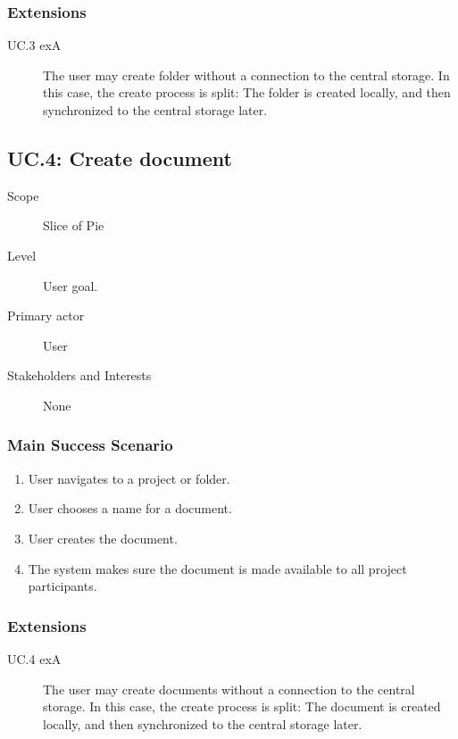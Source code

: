 \subsubsection{Extensions}
\begin{description}
    \item[UC.3 exA] The user may create folder without a connection to the central storage.
        In this case, the create process is split: The folder is created locally, and then synchronized
        to the central storage later.
\end{description}

\subsection{UC.4: Create document}
\begin{description}
    \item[Scope] Slice of Pie
    \item[Level] User goal.
    \item[Primary actor] User
    \item[Stakeholders and Interests] None
\end{description}
    
\subsubsection{Main Success Scenario}
\begin{enumerate}
    \item User navigates to a project or folder.
    \item User chooses a name for a document.
    \item User creates the document.
    \item The system makes sure the document is made available to all project participants.
\end{enumerate}
    
\subsubsection{Extensions}
\begin{description}
    \item[UC.4 exA] The user may create documents without a connection to the central storage.
        In this case, the create process is split: The document is created locally, and then
        synchronized to the central storage later.
\end{description}

